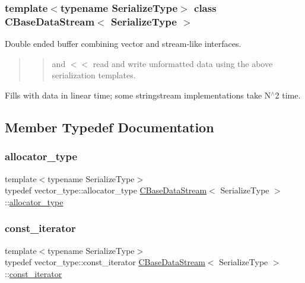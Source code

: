 \subsubsection*{template$<$typename Serialize\+Type$>$\newline
class C\+Base\+Data\+Stream$<$ Serialize\+Type $>$}

Double ended buffer combining vector and stream-\/like interfaces.

\begin{quote}
\begin{quote}
and $<$$<$ read and write unformatted data using the above serialization templates. \end{quote}
\end{quote}
Fills with data in linear time; some stringstream implementations take N$^\wedge$2 time. 

\subsection{Member Typedef Documentation}
\mbox{\label{class_c_base_data_stream_ae303e09f19f77d2d95ac99feabbeb6c3}} 
\subsubsection{\texorpdfstring{allocator\+\_\+type}{allocator\_type}}
{\footnotesize\ttfamily template$<$typename Serialize\+Type$>$ \\
typedef vector\+\_\+type\+::allocator\+\_\+type \mbox{\hyperlink{class_c_base_data_stream}{C\+Base\+Data\+Stream}}$<$ Serialize\+Type $>$\+::\mbox{\hyperlink{class_c_base_data_stream_ae303e09f19f77d2d95ac99feabbeb6c3}{allocator\+\_\+type}}}

\mbox{\label{class_c_base_data_stream_a9cf3080c5a75c94568980a59d3aab3ad}} 
\subsubsection{\texorpdfstring{const\+\_\+iterator}{const\_iterator}}
{\footnotesize\ttfamily template$<$typename Serialize\+Type$>$ \\
typedef vector\+\_\+type\+::const\+\_\+iterator \mbox{\hyperlink{class_c_base_data_stream}{C\+Base\+Data\+Stream}}$<$ Serialize\+Type $>$\+::\mbox{\hyperlink{class_c_base_data_stream_a9cf3080c5a75c94568980a59d3aab3ad}{const\+\_\+iterator}}}

